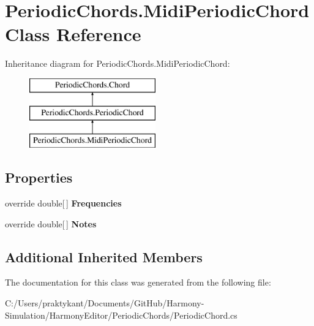 \hypertarget{class_periodic_chords_1_1_midi_periodic_chord}{\section{Periodic\+Chords.\+Midi\+Periodic\+Chord Class Reference}
\label{class_periodic_chords_1_1_midi_periodic_chord}
}
Inheritance diagram for Periodic\+Chords.\+Midi\+Periodic\+Chord\+:\begin{figure}[H]
\begin{center}
\leavevmode
\includegraphics[height=3.000000cm]{class_periodic_chords_1_1_midi_periodic_chord}
\end{center}
\end{figure}
\subsection*{Properties}
\begin{DoxyCompactItemize}
\item 
\hypertarget{class_periodic_chords_1_1_midi_periodic_chord_a53e10613924317f1d3fc92def7b62cab}{override double\mbox{[}$\,$\mbox{]} {\bfseries Frequencies}}\label{class_periodic_chords_1_1_midi_periodic_chord_a53e10613924317f1d3fc92def7b62cab}

\item 
\hypertarget{class_periodic_chords_1_1_midi_periodic_chord_a23ec201aea969c6a95638f0cc2cc0f73}{override double\mbox{[}$\,$\mbox{]} {\bfseries Notes}}\label{class_periodic_chords_1_1_midi_periodic_chord_a23ec201aea969c6a95638f0cc2cc0f73}

\end{DoxyCompactItemize}
\subsection*{Additional Inherited Members}


The documentation for this class was generated from the following file\+:\begin{DoxyCompactItemize}
\item 
C\+:/\+Users/praktykant/\+Documents/\+Git\+Hub/\+Harmony-\/\+Simulation/\+Harmony\+Editor/\+Periodic\+Chords/Periodic\+Chord.\+cs\end{DoxyCompactItemize}
